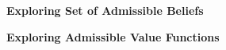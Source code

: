 \begin{frame}
\begin{center}\textbf{Exploring Set of Admissible Beliefs}
\end{center}
\end{frame}
\begin{frame}
\begin{center}\textbf{Exploring Admissible Value Functions}\vspace{0.3cm}
\end{center}
\end{frame}
